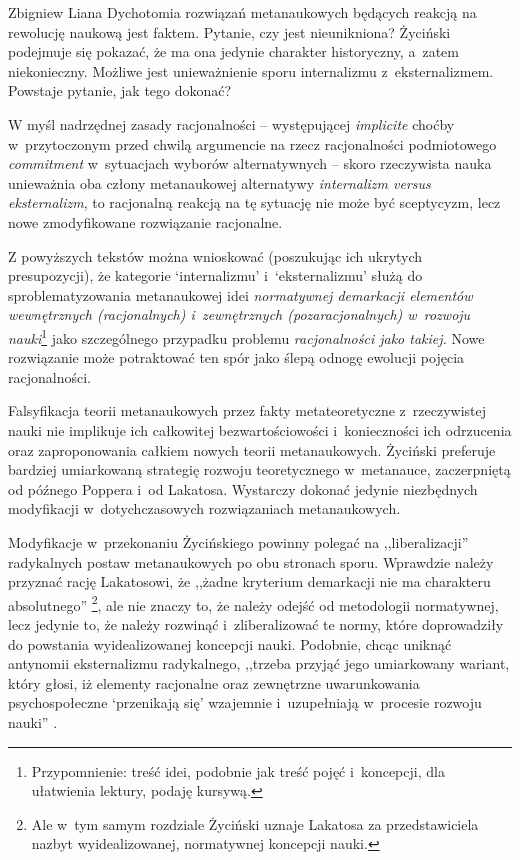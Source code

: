 \begin{artplenv}{Zbigniew Liana}
Dychotomia rozwiązań metanaukowych będących reakcją na rewolucję naukową jest faktem. Pytanie, czy jest nieunikniona?
Życiński podejmuje się pokazać, że ma ona jedynie charakter historyczny, a~zatem niekonieczny. Możliwe jest
unieważnienie sporu internalizmu z~eksternalizmem. Powstaje pytanie, jak tego dokonać?

W myśl nadrzędnej zasady racjonalności -- występującej \textit{implicite} choćby w~przytoczonym przed chwilą argumencie na
rzecz racjonalności podmiotowego \textit{commitment} w~sytuacjach wyborów alternatywnych -- skoro rzeczywista nauka
unieważnia oba człony metanaukowej alternatywy \textit{internalizm versus eksternalizm}, to racjonalną reakcją na tę
sytuację nie może być sceptycyzm, lecz nowe zmodyfikowane rozwiązanie racjonalne.

Z powyższych tekstów można wnioskować (poszukując ich ukrytych presupozycji), że kategorie
`internalizmu' i~`eksternalizmu' służą do sproblematyzowania metanaukowej idei \textit{normatywnej demarkacji
elementów wewnętrznych
(racjonalnych) i~zewnętrznych (pozaracjonalnych) w~rozwoju nauki}\footnote{Przypomnienie: treść idei, podobnie jak
treść pojęć i~koncepcji, dla ułatwienia lektury, podaję kursywą.} jako szczególnego przypadku problemu
\textit{racjonalności jako takiej. }Nowe rozwiązanie może potraktować ten spór jako ślepą odnogę ewolucji pojęcia
racjonalności.

Falsyfikacja teorii metanaukowych przez fakty metateoretyczne z~rzeczywistej nauki nie implikuje ich całkowitej
bezwartościowości i~konieczności ich odrzucenia oraz zaproponowania całkiem nowych teorii metanaukowych. Życiński
preferuje bardziej umiarkowaną strategię rozwoju teoretycznego w~metanauce, zaczerpniętą od późnego Poppera i~od
Lakatosa. Wystarczy dokonać jedynie niezbędnych modyfikacji w~dotychczasowych rozwiązaniach metanaukowych. 

Modyfikacje w~przekonaniu Życińskiego powinny polegać na ,,liberalizacji'' radykalnych postaw metanaukowych po obu
stronach sporu. Wprawdzie należy przyznać rację Lakatosowi, że ,,żadne kryterium demarkacji nie ma charakteru
absolutnego''
\parencite[s.~230]{zycinski_elementy_1996}\footnote{Ale w~tym samym rozdziale
\parencite*[s.~244]{zycinski_elementy_1996}
Życiński uznaje Lakatosa za przedstawiciela nazbyt
wyidealizowanej, normatywnej koncepcji nauki.}, ale nie znaczy to, że należy odejść od metodologii normatywnej, lecz
jedynie to, że należy rozwinąć i~zliberalizować te normy, które doprowadziły do powstania wyidealizowanej koncepcji
nauki. Podobnie, chcąc uniknąć antynomii eksternalizmu radykalnego, ,,trzeba przyjąć jego umiarkowany wariant, który
głosi, iż elementy racjonalne oraz zewnętrzne uwarunkowania psychospołeczne `przenikają się'
wzajemnie i~uzupełniają w~procesie rozwoju nauki''
\parencite[s.~156]{zycinski_elementy_1996}.


\end{artplenv}
